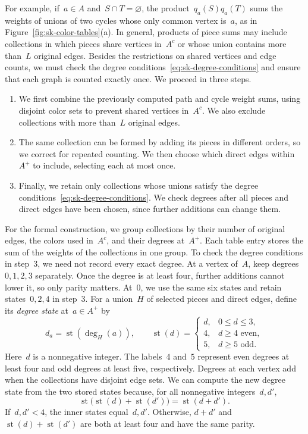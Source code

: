 \documentclass[letterpaper,11pt,reqno]{amsart}
\renewcommand{\leq}{\leqslant}
\renewcommand{\geq}{\geqslant}
\DeclareMathOperator{\degstate}{st}
\begin{document}
For example, if~$a\in A$ and~$S\cap T=\varnothing$, the product~$q_a(S)q_a(T)$ sums the weights of unions of two cycles whose only common vertex is~$a$, as in Figure~\ref{fig:sk-color-tables}(a). In general, products of piece sums may include collections in which pieces share vertices in~$A^c$ or whose union contains more than~$L$ original edges. Besides the restrictions on shared vertices and edge counts, we must check the degree conditions~\eqref{eq:sk-degree-conditions} and ensure that each graph is counted exactly once. We proceed in three steps.
\begin{enumerate}
\item We first combine the previously computed path and cycle weight sums, using disjoint color sets to prevent shared vertices in~$A^c$. We also exclude collections with more than~$L$ original edges.
\item The same collection can be formed by adding its pieces in different orders, so we correct for repeated counting. We then choose which direct edges within~$A^+$ to include, selecting each at most once.
\item Finally, we retain only collections whose unions satisfy the degree conditions~\eqref{eq:sk-degree-conditions}. We check degrees after all pieces and direct edges have been chosen, since further additions can change them.
\end{enumerate}

For the formal construction, we group collections by their number of original edges, the colors used in~$A^c$, and their degrees at~$A^+$. Each table entry stores the sum of the weights of the collections in one group. To check the degree conditions in step~3, we need not record every exact degree. At a vertex of~$A$, keep degrees~$0,1,2,3$ separately. Once the degree is at least four, further additions cannot lower it, so only parity matters. At~$0$, we use the same six states and retain states~$0,2,4$ in step~3. For a union~$H$ of selected pieces and direct edges, define its \emph{degree state} at~$a\in A^+$ by
\begin{equation*}
d_a=\degstate(\deg_H(a)),\qquad
\degstate(d)=\begin{cases}
d,&0\leq d\leq3,\\
4,&d\geq4\text{ even},\\
5,&d\geq5\text{ odd}.
\end{cases}
\end{equation*}
Here~$d$ is a nonnegative integer. The labels~$4$ and~$5$ represent even degrees at least four and odd degrees at least five, respectively. Degrees at each vertex add when the collections have disjoint edge sets. We can compute the new degree state from the two stored states because, for all nonnegative integers~$d,d'$,
\begin{equation*}
\degstate\bigl(\degstate(d)+\degstate(d')\bigr)=\degstate(d+d').
\end{equation*}
If~$d,d'<4$, the inner states equal~$d,d'$. Otherwise, $d+d'$ and~$\degstate(d)+\degstate(d')$ are both at least four and have the same parity.
\end{document}
